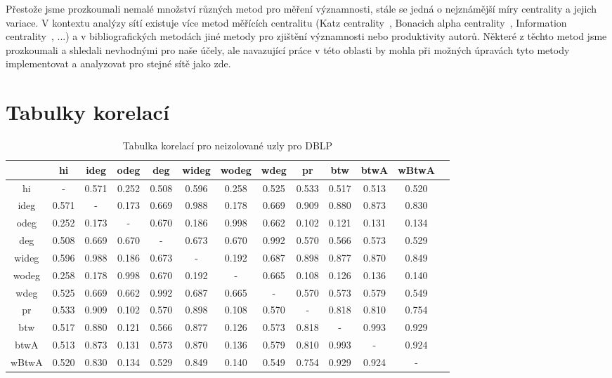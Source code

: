 \documentclass{bakalarka}
\begin{document}
Přestože jsme prozkoumali nemalé množství různých metod pro měření významnosti,
stále se jedná o nejznámější míry centrality a jejich variace. V kontextu
analýzy sítí existuje více metod měřících centralitu (Katz
centrality~\citep{katz1953}, Bonacich alpha
centrality~\citep{bonacichlloyd2001}, Information
centrality~\citep{stephensonzelen1989}, ...) a v bibliografických metodách jiné
metody pro zjištění významnosti nebo produktivity autorů. Některé z těchto
metod jsme prozkoumali a shledali nevhodnými pro naše účely, ale navazující
práce v této oblasti by mohla při možných úpravách tyto metody implementovat a
analyzovat pro stejné sítě jako zde.






\appendix

\newpage
\chapter{Tabulky korelací}
\begin{table}[!ht]
\centering
\caption{Tabulka korelací pro neizolované uzly pro DBLP}
\label{tab:corr1}
\begin{sideways}
\begin{tabular}{c|cccccccccccc}
\toprule
&hi  &ideg &odeg &deg  &wideg&wodeg&wdeg &pr   &btw  &btwA &wBtwA\\
\midrule
hi   &  -  &0.571&0.252&0.508&0.596&0.258&0.525&0.533&0.517&0.513&0.520\\
ideg &0.571&  -  &0.173&0.669&0.988&0.178&0.669&0.909&0.880&0.873&0.830\\
odeg &0.252&0.173&  -  &0.670&0.186&0.998&0.662&0.102&0.121&0.131&0.134\\
deg  &0.508&0.669&0.670&  -  &0.673&0.670&0.992&0.570&0.566&0.573&0.529\\
wideg&0.596&0.988&0.186&0.673&  -  &0.192&0.687&0.898&0.877&0.870&0.849\\
wodeg&0.258&0.178&0.998&0.670&0.192&  -  &0.665&0.108&0.126&0.136&0.140\\
wdeg &0.525&0.669&0.662&0.992&0.687&0.665&  -  &0.570&0.573&0.579&0.549\\
pr   &0.533&0.909&0.102&0.570&0.898&0.108&0.570&  -  &0.818&0.810&0.754\\
btw  &0.517&0.880&0.121&0.566&0.877&0.126&0.573&0.818&  -  &0.993&0.929\\
btwA &0.513&0.873&0.131&0.573&0.870&0.136&0.579&0.810&0.993&  -  &0.924\\
wBtwA&0.520&0.830&0.134&0.529&0.849&0.140&0.549&0.754&0.929&0.924&  -  \\
\bottomrule
\end{tabular}
\end{sideways}
\end{table}
\end{document}
